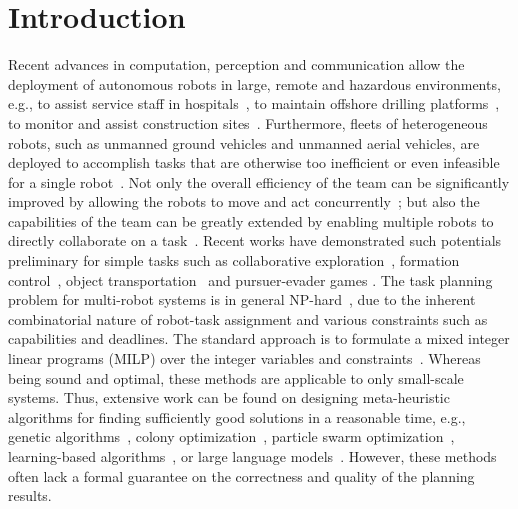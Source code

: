 \section{Introduction}

Recent advances in computation, perception and communication
allow the deployment of autonomous robots in large, remote and hazardous environments,
e.g., to assist service staff in hospitals~\cite{jemal2015multi},
to maintain offshore drilling platforms~\cite{cliff2015online},
to monitor and assist construction sites~\cite{zhang2009collaborative}.
Furthermore, fleets of heterogeneous robots,
such as unmanned ground vehicles and unmanned aerial vehicles,
are deployed to accomplish tasks that are otherwise too inefficient
or even infeasible for a single robot~\cite{arai2002advances}.
Not only the overall efficiency of the team can be significantly improved
by allowing the robots to move and act concurrently~\cite{toth2002overview};
but also the capabilities of the team can be greatly extended by
enabling multiple robots to directly collaborate on a task~\cite{fink2008multi}.
Recent works have demonstrated such potentials preliminary for simple
tasks such as collaborative exploration~\cite{doi:10.1126/scirobotics.ade9548}, formation control~\cite{varava2017herding},
object transportation~\cite{doi:10.1126/scirobotics.abf1628} and pursuer-evader games \cite{doi:10.34133/research.0246}.
The task planning problem for multi-robot systems is in general NP-hard~\cite{1997Task},
due to the inherent combinatorial nature of robot-task assignment and various constraints such as capabilities and deadlines.
The standard approach is to formulate a mixed integer linear programs (MILP)
over the integer variables and constraints~\cite{agrawal2016scalable}.
Whereas being sound and optimal, these methods are applicable to only small-scale systems.
Thus, extensive work can be found on designing meta-heuristic algorithms for finding
sufficiently good solutions in a reasonable time,
e.g., genetic algorithms~\cite{KESHANCHI20171}, colony optimization~\cite{li2017multi,doi:10.34133/2020/1762107},
particle swarm optimization~\cite{yan2021task,8280872},
learning-based algorithms~\cite{wells2019learning,pmlr-v70-omidshafiei17a,liu2019task},
or large language models~\cite{}.
However, these methods often lack a formal guarantee on the correctness and quality of the planning
results.


